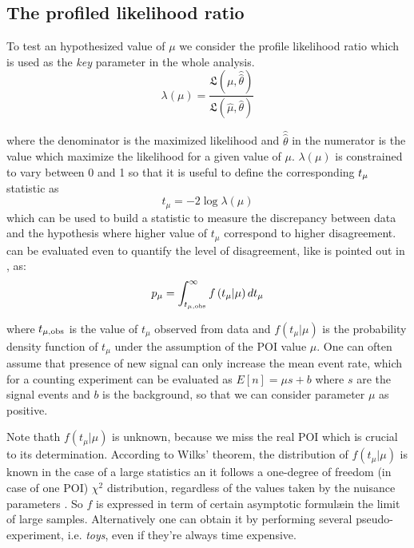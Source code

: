 \subsection{The profiled likelihood ratio}
To test an hypothesized value of $\mu$ we consider the profile likelihood ratio which is used as the {\itshape key} parameter in the whole analysis.
\begin{equation}
  \lambda(\mu) = \frac {\mathfrak{L}(\mu,\hat{\hat{\theta}})}{\mathfrak{L(\hat{\mu},\hat{\theta})}}
\end{equation}

where the denominator is the maximized likelihood and $\hat{\hat{\theta}}$ in the numerator is the value which maximize the likelihood for a given value of $\mu$. $\lambda(\mu)$ is constrained to vary between 0 and 1 so that it is useful to define the corresponding $t_{\mu}$ statistic as 
\begin{equation}
  t_{\mu} = -2 \log{\lambda(\mu)}
\end{equation}
which can be used to build a statistic to measure the discrepancy between data and the hypothesis where higher value of $t_{\mu}$ correspond to higher disagreement. \p can be evaluated even to quantify the level of disagreement, like is pointed out in \Fig{\ref{pvalue}}, as:
\begin{equation}
 p_{\mu}=\int_{t_{\mu,\textup{obs}}}^\infty f\left(t_\mu \vert \mu\right) dt_\mu
\end{equation}

where $t_{\mu,\textup{obs}}$ is the value of $t_\mu$ observed from data and $f\left(t_\mu \vert \mu\right)$ is the probability density function of $t_\mu$ under the assumption of the POI value $\mu$. One can often assume that presence of new signal can only increase the mean event rate, which for a counting experiment can be evaluated as $E[n] = \mu s + b$ where $s$ are the signal events and $b$ is the background, so that we can consider parameter $\mu$ as positive.

Note thath $f\left(t_\mu \vert \mu\right)$ is unknown, because we miss the real POI which is crucial to its determination. According to Wilks' theorem, the distribution of $f(t_\mu \vert \mu)$ is known in the case of a large statistics an it follows a one-degree of freedom (in case of one POI) $\chi^2$ distribution, regardless of the values taken by the nuisance parameters . So $f$ is expressed in term of certain asymptotic formul\ae in the limit of large samples. Alternatively one can obtain it by performing several pseudo-experiment, i.e. \emph{toys}, even if they're always time expensive.

